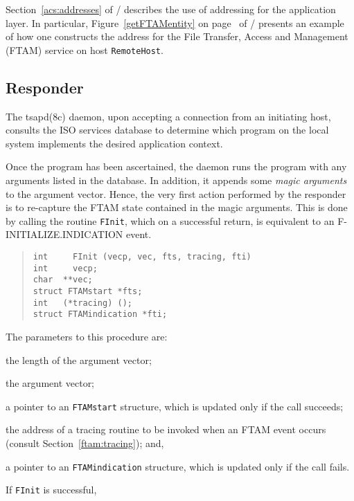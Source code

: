Section~\ref{acs:addresses} of \volone/ describes the use of addressing
for the application layer.
In particular,
Figure~\ref{getFTAMentity} on page~\pageref{getFTAMentity} of \volone/
presents
an example of how one constructs the address for the File Transfer, Access
and Management (FTAM) service on host \verb"RemoteHost".

\subsection	{Responder}
The \man tsapd(8c) daemon,
upon accepting a connection from an initiating host,
consults the ISO services database to determine which program
on the local system implements the desired application context.

Once the program has been ascertained,
the daemon runs the program with any arguments listed in the database.
In addition,
it appends some {\em magic arguments\/} to the argument vector.
Hence,
the very first action performed by the responder is to re-capture the FTAM
state contained in the magic arguments.
This is done by calling the routine \verb"FInit",
which on a successful return,
is equivalent to an {\sf F-INITIALIZE.INDICATION\/} event.
\begin{quote}\small\begin{verbatim}
int     FInit (vecp, vec, fts, tracing, fti)
int     vecp;
char  **vec;
struct FTAMstart *fts;
int   (*tracing) ();
struct FTAMindication *fti;
\end{verbatim}\end{quote}
The parameters to this procedure are:
\begin{describe}
\item[\verb"vecp":] the length of the argument vector;

\item[\verb"vec":] the argument vector;

\item[\verb"fts":] a pointer to an \verb"FTAMstart" structure,
which is updated only if the call succeeds;

\item[\verb"tracing":] the address of a tracing routine to be invoked when an
FTAM event occurs (consult Section~\ref{ftam:tracing});
and,

\item[\verb"fti":] a pointer to an \verb"FTAMindication" structure,
which is updated only if the call fails.
\end{describe}
If \verb"FInit" is successful,
